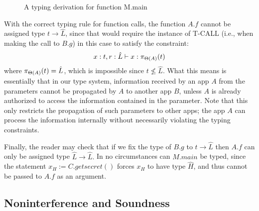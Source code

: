 {{{\begin{figure*}[ht]
\caption{A typing derivation for function M.main}
\label{fig:type2}
\end{figure*}

With the correct typing rule for function calls, the function $A.f$ cannot be assigned type
$t \rightarrow \hat{L}$, since that would require the instance of T-CALL (i.e., when making the
call to $B.g$) in this case to satisfy
the constraint:
\[
x : t, r : \hat{L} \vdash x : \app{t}{\Theta(A)}
\]
where $\app{t}{\Theta(A)} = \hat{L}$, which is impossible since $t \not \leq \hat{L}.$ What this
means is essentially that in our type system, information received by an app $A$ from the parameters
cannot be propagated by $A$ to another app $B$, unless $A$ is already authorized to access the
information contained in the parameter. Note that this only restricts the propagation of such parameters
to other apps; the app $A$ can process the information internally without necessarily violating
the typing constraints.

Finally, the reader may check that if we fix the type of $B.g$ to $t \rightarrow \hat{L}$ then
$A.f$ can only be assigned type $\hat{L} \rightarrow \hat{L}.$ In no circumstances can
$M.main$ be typed, since the statement $x_H := C.getsecret()$ forces $x_H$ to have
type $\hat{H}$, and thus cannot be passed to $A.f$ as an argument.



\subsection{Noninterference and Soundness}\label{sec:non-interference}

}}}
